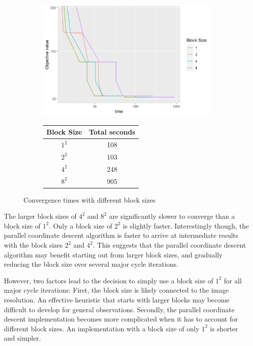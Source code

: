 \begin{figure}[h]
	\centering
	\begin{subfigure}{0.6\linewidth}
		\includegraphics[width=1.0\linewidth]{./chapters/05.pcdm/parameters/blockSize.png}
	\end{subfigure}
	\begin{subfigure}{0.35\linewidth}
		\begin{tabular}{c | c}
			Block Size & Total seconds \\ \hline
			$1^2$ & 108 \\
			$2^2$ & 103 \\
			$4^2$ & 248 \\
			$8^2$ & 905 \\
		\end{tabular}
	\end{subfigure}
	\caption{Convergence times with different block sizes}
	\label{pcdm:results:block}
\end{figure}

The larger block sizes of $4^2$ and $8^2$ are significantly slower to converge than a block size of $1^2$. Only a block size of $2^2$ is slightly faster. Interestingly though, the parallel coordinate descent algorithm is faster to arrive at intermediate results with the block sizes $2^2$ and $4^2$. This suggests that the parallel coordinate descent algorithm may benefit starting out from larger block sizes, and gradually reducing the block size over several major cycle iterations.

However, two factors lead to the decision to simply use a block size of $1^2$ for all major cycle iterations: First, the block size is likely connected to the image resolution. An effective heuristic that starts with larger blocks may become difficult to develop for general observations. Secondly, the parallel coordinate descent implementation becomes more complicated when it has to account for different block sizes. An implementation with a block size of only $1^2$ is shorter and simpler.

